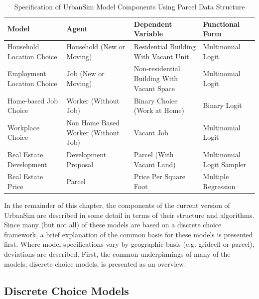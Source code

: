 \begin{table}[htp]
\caption{Specification of UrbanSim Model Components Using Parcel Data Structure}
\label{tab:components-parcel}
\begin{tabular}{p{4.5cm} p{3.4cm}p{3.4cm}p{3.3cm}}
\toprule[1.5pt]
Model & Agent & Dependent Variable & Functional Form \\
\midrule
Household Location Choice & Household (New or Moving) & Residential Building With Vacant Unit & Multinomial Logit \\
\midrule
Employment Location Choice & Job (New or Moving) & Non-residential Building With Vacant Space & Multinomial Logit \\
\midrule
Home-based Job Choice & Worker (Without Job) & Binary Choice (Work at Home) & Binary Logit \\
\midrule
Workplace Choice & Non Home Based Worker (Without Job) & Vacant Job & Multinomial Logit \\
\midrule
Real Estate Development  & Development Proposal & Parcel (With Vacant Land) & Multinomial Logit Sampler \\
\midrule
Real Estate Price & Parcel & Price Per Square Foot & Multiple Regression \\
\bottomrule[1.5pt]
\end{tabular}
\end{table}


In the remainder of this chapter, the components of the current version of UrbanSim
are described in some detail in terms of their
structure and algorithms.  Since many (but not all) of these models are based on a discrete choice framework,
a brief explanation of the common basis for these models is presented first.  Where model specifications
vary by geographic basis (e.g. gridcell or parcel), deviations are described.  First, the common underpinnings
of many of the models, discrete choice models, is presented as an overview.

\subsection{Discrete Choice Models}
\label{sec:discrete-choice}

